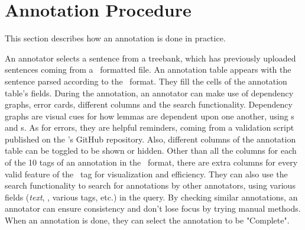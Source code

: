 \section{Annotation Procedure}
\label{sec:annotation}
This section describes how an annotation is done in practice.

An annotator selects a sentence from a treebank, which has previously uploaded sentences coming from a \conllu\ formatted file.
An annotation table appears with the sentence parsed according to the \ud\ format.
They fill the cells of the annotation table's fields.
During the annotation, an annotator can make use of dependency graphs, error cards, different columns and the search functionality.
Dependency graphs are visual cues for how lemmas are dependent upon one another, using \head s and \deprel s.
As for errors, they are helpful reminders, coming from a validation script published on the \ud's GitHub repository.
Also, different columns of the annotation table can be toggled to be shown or hidden.
Other than all the columns for each of the 10 tags of an annotation in the \conllu\ format, there are extra columns for every valid feature of the \feats\ tag for visualization and efficiency.
They can also use the search functionality to search for annotations by other annotators, using various fields (\textit{text}, \feats, various tags, etc.) in the query.
By checking similar annotations, an annotator can ensure consistency and don't lose focus by trying manual methods.
When an annotation is done, they can select the annotation to be "Complete".
